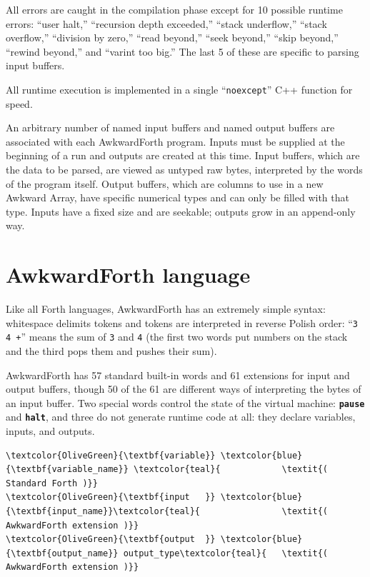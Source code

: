 \documentclass{webofc}
\begin{document}
All errors are caught in the compilation phase except for 10 possible runtime errors: ``user halt,'' ``recursion depth exceeded,'' ``stack underflow,'' ``stack overflow,'' ``division by zero,'' ``read beyond,'' ``seek beyond,'' ``skip beyond,'' ``rewind beyond,'' and ``varint too big.'' The last 5 of these are specific to parsing input buffers.

All runtime execution is implemented in a single ``\texttt{noexcept}'' C++ function for speed.

An arbitrary number of named input buffers and named output buffers are associated with each AwkwardForth program. Inputs must be supplied at the beginning of a run and outputs are created at this time. Input buffers, which are the data to be parsed, are viewed as untyped raw bytes, interpreted by the words of the program itself. Output buffers, which are columns to use in a new Awkward Array, have specific numerical types and can only be filled with that type. Inputs have a fixed size and are seekable; outputs grow in an append-only way.

\section{AwkwardForth language}

Like all Forth languages, AwkwardForth has an extremely simple syntax: whitespace delimits tokens and tokens are interpreted in reverse Polish order: ``\texttt{3 4 +}'' means the sum of \texttt{3} and \texttt{4} (the first two words put numbers on the stack and the third pops them and pushes their sum).

AwkwardForth has 57 standard built-in words and 61 extensions for input and output buffers, though 50 of the 61 are different ways of interpreting the bytes of an input buffer. Two special words control the state of the virtual machine: \textcolor{OliveGreen}{\tt\textbf{pause}} and \textcolor{OliveGreen}{\tt\textbf{halt}}, and three do not generate runtime code at all: they declare variables, inputs, and outputs.

\begin{Verbatim}[commandchars=\\\{\}]
\textcolor{OliveGreen}{\textbf{variable}} \textcolor{blue}{\textbf{variable_name}} \textcolor{teal}{            \textit{( Standard Forth )}}
\textcolor{OliveGreen}{\textbf{input   }} \textcolor{blue}{\textbf{input_name}}\textcolor{teal}{                \textit{( AwkwardForth extension )}}
\textcolor{OliveGreen}{\textbf{output  }} \textcolor{blue}{\textbf{output_name}} output_type\textcolor{teal}{   \textit{( AwkwardForth extension )}}
\end{Verbatim}
\end{document}

